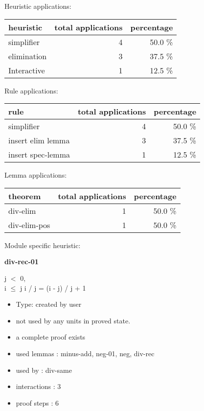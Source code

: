 \documentclass[a4paper]{article}
\begin{document}
\medskip


Heuristic applications:

\begin{supertabular}{l|r|r}
heuristic	& total applications & percentage \\ \hline
simplifier & 4 & 50.0 \% \\
elimination & 3 & 37.5 \% \\
Interactive & 1 & 12.5 \% \\

\end{supertabular}

Rule applications:

\begin{supertabular}{l|r|r}
rule	        & total applications & percentage \\ \hline
simplifier & 4 & 50.0 \% \\
insert elim lemma & 3 & 37.5 \% \\
insert spec-lemma & 1 & 12.5 \% \\

\end{supertabular}

Lemma applications:

\begin{supertabular}{l|r|r}
theorem	        & total applications & percentage \\ \hline
div-elim & 1 & 50.0 \% \\
div-elim-pos & 1 & 50.0 \% \\

\end{supertabular}

Module specific heuristic:

\pagebreak

{\LARGE\bf div-rec-01}\label{lemma-div-rec-01}

\medskip

j $<$ 0, \\
i $\le$ j \Fol i / j = (i - j) / j + 1

\begin{itemize}

\item Type: created by user

\item not used by any units in proved state.
\item       a complete proof exists
\item       used lemmas  : minus-add, neg-01, neg, div-rec
\item       used by      : div-same
\item       interactions : 3
\item       proof steps  : 6
\end{itemize}
\end{document}
